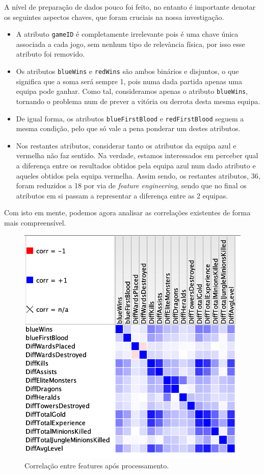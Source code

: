 A nível de preparação de dados pouco foi feito, no entanto é importante denotar os seguintes aspectos chaves, que foram cruciais na nossa investigação.

\begin{itemize}
    \item A atributo \texttt{gameID} é completamente irrelevante pois é uma chave única associada a cada jogo, sem nenhum tipo de relevància física, por isso esse atributo foi removido.
    \item Os atributos \texttt{blueWins} e \texttt{redWins} são ambos binários e disjuntos, o que significa que a soma será sempre 1, pois numa dada partida apenas uma equipa pode ganhar. Como tal, consideramos apenas o atributo \texttt{blueWins}, tornando o problema num de prever a vitória ou derrota desta mesma equipa.
    \item De igual forma, os atributos \texttt{blueFirstBlood} e \texttt{redFirstBlood} seguem a mesma condição, pelo que só vale a pena ponderar um destes atributos.
    \item Nos restantes atributos, considerar tanto os atributos da equipa azul e vermelha não faz sentido. Na verdade, estamos interessados em perceber qual a diferença entre os resultados obtidos pela equipa azul num dado atributo e aqueles obtidos pela equipa vermelha. Assim sendo, os restantes atributos, 36, foram reduzidos a 18 por via de \textit{feature engineering}, sendo que no final os atributos em si passam a representar a diferença entre as 2 equipas.
\end{itemize}

Com isto em mente, podemos agora analisar as correlações existentes de forma mais compreensível.

\begin{figure}[H]
    \centering
    \includegraphics[width=0.5\linewidth]{Figures/RankCorrelation.png}
    \caption{Correlação entre features após processamento.}
    \label{fig:corr1}
\end{figure}

